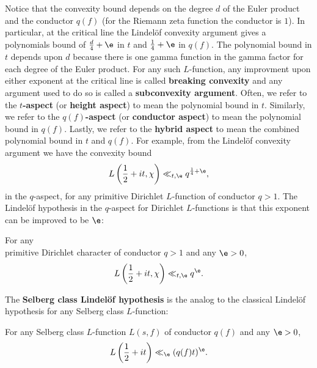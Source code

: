     Notice that the convexity bound depends on the degree $d$ of the Euler product and the conductor $q(f)$ (for the Riemann zeta function the conductor is $1$). In particular, at the critical line the Lindel\"of convexity argument gives a polynomials bound of $\frac{d}{4}+\e$ in $t$ and $\frac{1}{4}+\e$ in $q(f)$. The polynomial bound in $t$ depends upon $d$ because there is one gamma function in the gamma factor for each degree of the Euler product. For any such $L$-function, any improvment upon either exponent at the critical line is called \textbf{breaking convexity} and any argument used to do so is called a \textbf{subconvexity argument}. Often, we refer to the \textbf{$t$-aspect} (or \textbf{height aspect}) to mean the polynomial bound in $t$. Similarly, we refer to the \textbf{$q(f)$-aspect} (or \textbf{conductor aspect}) to mean the polynomial bound in $q(f)$. Lastly, we refer to the \textbf{hybrid aspect} to mean the combined polynomial bound in $t$ and $q(f)$. For example, from the Lindel\"of convexity argument we have the convexity bound
    \[
      L\left(\frac{1}{2}+it,\chi\right) \ll_{t,\e} q^{\frac{1}{4}+\e},
    \]
    in the $q$-aspect, for any primitive Dirichlet $L$-function of conductor $q > 1$. The Lindel\"of hypothesis in the $q$-aspect for Dirichlet $L$-functions is that this exponent can be improved to be $\e$:

    \begin{conjecture}
      For any \\ primitive Dirichlet character of conductor $q > 1$ and any $\e > 0$,
      \[
        L\left(\frac{1}{2}+it,\chi\right) \ll_{t,\e} q^{\e}.
      \]
    \end{conjecture}
    
     The \textbf{Selberg class Lindel\"of hypothesis} is the analog to the classical Lindel\"of hypothesis for any Selberg class $L$-function:

    \begin{conjecture}
      For any Selberg class $L$-function $L(s,f)$ of conductor $q(f)$ and any $\e > 0$,
      \[
        L\left(\frac{1}{2}+it\right) \ll_{\e} (q(f)t)^{\e}.
      \]
    \end{conjecture}